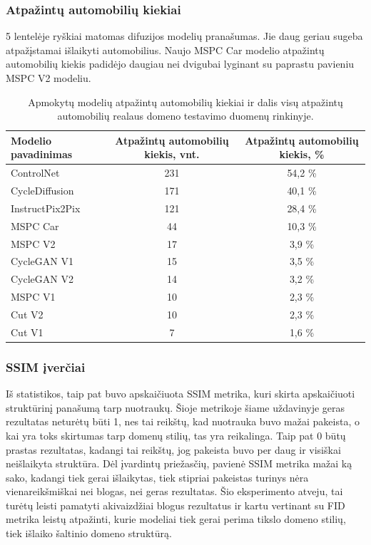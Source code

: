 \documentclass{VUMIFPSbakalaurinis}
\begin{document}
        \subsubsection{Atpažintų automobilių kiekiai}
            5 lentelėje ryškiai matomas difuzijos modelių pranašumas. Jie daug geriau sugeba atpažįstamai išlaikyti automobilius. Naujo MSPC Car modelio atpažintų automobilių kiekis padidėjo daugiau nei dvigubai lyginant su paprastu pavieniu MSPC V2 modeliu.
        
            \begin{table}[H]
                \footnotesize
                \centering
                \caption{Apmokytų modelių atpažintų automobilių kiekiai ir dalis visų atpažintų automobilių realaus domeno testavimo duomenų rinkinyje.}
                {\begin{tabular}{|l|c|c|} \hline
                    Modelio pavadinimas & Atpažintų automobilių kiekis, vnt. & Atpažintų automobilių kiekis, \% \\
                    \hline
                    ControlNet & 231 & 54,2 \%\\ %
                    CycleDiffusion & 171 & 40,1 \% \\ %
                    InstructPix2Pix & 121 & 28,4 \%\\ %
                    MSPC Car & 44 & 10,3 \%\\ %
                    MSPC V2 & 17 & 3,9 \%\\
                    CycleGAN V1 & 15 & 3,5 \%\\
                    CycleGAN V2 & 14 & 3,2 \%\\
                    MSPC V1 & 10 & 2,3 \%\\
                    Cut V2 & 10 & 2,3 \%\\ 
                    Cut V1 & 7 & 1,6 \%\\
                    \hline
                    \end{tabular}
                }
                \label{tab:table example}
            \end{table}

        \subsubsection{SSIM įverčiai}
            Iš statistikos, taip pat buvo apskaičiuota SSIM metrika, kuri skirta apskaičiuoti struktūrinį panašumą tarp nuotraukų. Šioje metrikoje šiame uždavinyje geras rezultatas neturėtų būti 1, nes tai reikštų, kad nuotrauka buvo mažai pakeista, o kai yra toks skirtumas tarp domenų stilių, tas yra reikalinga. Taip pat 0 būtų prastas rezultatas, kadangi tai reikštų, jog pakeista buvo per daug ir visiškai neišlaikyta struktūra. Dėl įvardintų priežasčių, pavienė SSIM metrika mažai ką sako, kadangi tiek gerai išlaikytas, tiek stipriai pakeistas turinys nėra vienareikšmiškai nei blogas, nei geras rezultatas. Šio eksperimento atveju, tai turėtų leisti pamatyti akivaizdžiai blogus rezultatus ir kartu vertinant su FID metrika leistų atpažinti, kurie modeliai tiek gerai perima tikslo domeno stilių, tiek išlaiko šaltinio domeno struktūrą. 
            
\end{document}
